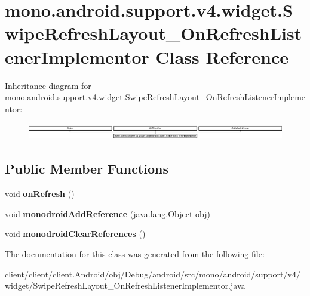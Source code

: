 \hypertarget{classmono_1_1android_1_1support_1_1v4_1_1widget_1_1SwipeRefreshLayout__OnRefreshListenerImplementor}{}\section{mono.\+android.\+support.\+v4.\+widget.\+Swipe\+Refresh\+Layout\+\_\+\+On\+Refresh\+Listener\+Implementor Class Reference}
\label{classmono_1_1android_1_1support_1_1v4_1_1widget_1_1SwipeRefreshLayout__OnRefreshListenerImplementor}
Inheritance diagram for mono.\+android.\+support.\+v4.\+widget.\+Swipe\+Refresh\+Layout\+\_\+\+On\+Refresh\+Listener\+Implementor\+:\begin{figure}[H]
\begin{center}
\leavevmode
\includegraphics[height=0.745176cm]{classmono_1_1android_1_1support_1_1v4_1_1widget_1_1SwipeRefreshLayout__OnRefreshListenerImplementor}
\end{center}
\end{figure}
\subsection*{Public Member Functions}
\begin{DoxyCompactItemize}
\item 
\hypertarget{classmono_1_1android_1_1support_1_1v4_1_1widget_1_1SwipeRefreshLayout__OnRefreshListenerImplementor_a74f3896d97f8baf7046389f758407a1c}{}void {\bfseries on\+Refresh} ()\label{classmono_1_1android_1_1support_1_1v4_1_1widget_1_1SwipeRefreshLayout__OnRefreshListenerImplementor_a74f3896d97f8baf7046389f758407a1c}

\item 
\hypertarget{classmono_1_1android_1_1support_1_1v4_1_1widget_1_1SwipeRefreshLayout__OnRefreshListenerImplementor_a422bf9708796c9a0bcaaec2137d8200a}{}void {\bfseries monodroid\+Add\+Reference} (java.\+lang.\+Object obj)\label{classmono_1_1android_1_1support_1_1v4_1_1widget_1_1SwipeRefreshLayout__OnRefreshListenerImplementor_a422bf9708796c9a0bcaaec2137d8200a}

\item 
\hypertarget{classmono_1_1android_1_1support_1_1v4_1_1widget_1_1SwipeRefreshLayout__OnRefreshListenerImplementor_a2669d5c1b40a370723a749b9aa381407}{}void {\bfseries monodroid\+Clear\+References} ()\label{classmono_1_1android_1_1support_1_1v4_1_1widget_1_1SwipeRefreshLayout__OnRefreshListenerImplementor_a2669d5c1b40a370723a749b9aa381407}

\end{DoxyCompactItemize}


The documentation for this class was generated from the following file\+:\begin{DoxyCompactItemize}
\item 
client/client/client.\+Android/obj/\+Debug/android/src/mono/android/support/v4/widget/Swipe\+Refresh\+Layout\+\_\+\+On\+Refresh\+Listener\+Implementor.\+java\end{DoxyCompactItemize}
